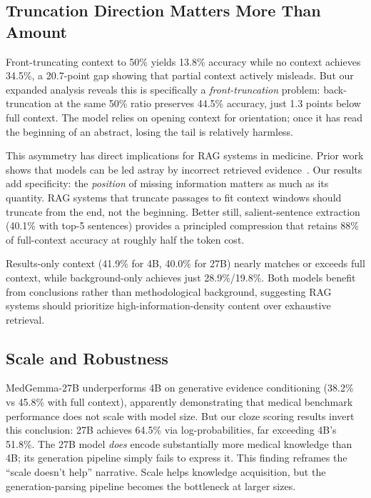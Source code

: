 \documentclass[runningheads,a4paper]{llncs}
\begin{document}
\subsection{Truncation Direction Matters More Than Amount}

Front-truncating context to 50\% yields 13.8\% accuracy while no context achieves 34.5\%, a 20.7-point gap showing that partial context actively misleads. But our expanded analysis reveals this is specifically a \textit{front-truncation} problem: back-truncation at the same 50\% ratio preserves 44.5\% accuracy, just 1.3 points below full context. The model relies on opening context for orientation; once it has read the beginning of an abstract, losing the tail is relatively harmless.

This asymmetry has direct implications for RAG systems in medicine. Prior work shows that models can be led astray by incorrect retrieved evidence~\cite{wu2024clasheval,barnett2024rag}. Our results add specificity: the \textit{position} of missing information matters as much as its quantity. RAG systems that truncate passages to fit context windows should truncate from the end, not the beginning. Better still, salient-sentence extraction (40.1\% with top-5 sentences) provides a principled compression that retains 88\% of full-context accuracy at roughly half the token cost.

Results-only context (41.9\% for 4B, 40.0\% for 27B) nearly matches or exceeds full context, while background-only achieves just 28.9\%/19.8\%. Both models benefit from conclusions rather than methodological background, suggesting RAG systems should prioritize high-information-density content over exhaustive retrieval.

\subsection{Scale and Robustness}

MedGemma-27B underperforms 4B on generative evidence conditioning (38.2\% vs 45.8\% with full context), apparently demonstrating that medical benchmark performance does not scale with model size. But our cloze scoring results invert this conclusion: 27B achieves 64.5\% via log-probabilities, far exceeding 4B's 51.8\%. The 27B model \textit{does} encode substantially more medical knowledge than 4B; its generation pipeline simply fails to express it. This finding reframes the ``scale doesn't help'' narrative. Scale helps knowledge acquisition, but the generation-parsing pipeline becomes the bottleneck at larger sizes.
\end{document}
